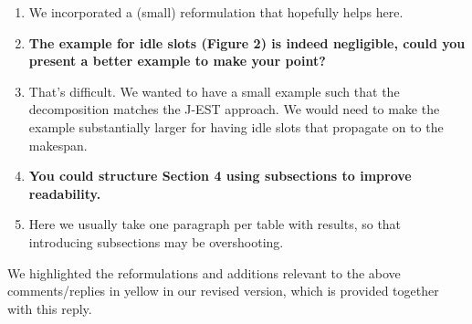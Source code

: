 \documentclass[11pt]{article}
\begin{document}
\begin{enumerate}[wide, labelwidth=!, labelindent=0pt]
\item[] We incorporated a (small) reformulation that hopefully helps here.
\item \textbf{The example for idle slots (Figure 2) is indeed negligible, could you present a better example to make your point? }
\item[] That's difficult. We wanted to have a small example such that the decomposition matches
        the J-EST approach. We would need to make the example substantially larger for having idle slots that propagate on to the makespan.
\item \textbf{You could structure Section 4 using subsections to improve readability.}
\item[] Here we usually take one paragraph per table with results, so that introducing subsections
        may be overshooting. 
\end{enumerate}
We highlighted the reformulations and additions relevant to the above comments/replies in yellow in our revised version, which is provided together with this reply.
\end{document}

